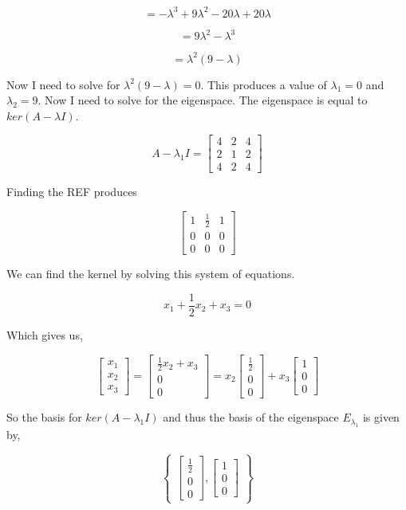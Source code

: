 \documentclass{article}
\begin{document}
\[ = -\lambda^3 + 9\lambda^2 - 20\lambda + 20\lambda \]

\[ = 9\lambda^2 - \lambda^3 \]

\[ = \lambda^2(9 - \lambda) \]

Now I need to solve for $\lambda^2(9 - \lambda) = 0$. This produces a value of $\lambda_1 = 0$ and $\lambda_2 = 9$. Now I need to solve for the eigenspace. The eigenspace is equal to $ker(A-\lambda I)$.

\[ A - \lambda_1 I = \begin{bmatrix} 4 & 2 & 4 \\ 2 & 1 & 2 \\ 4 & 2 & 4 \end{bmatrix} \]

Finding the REF produces

\[ \begin{bmatrix} 1 & \frac{1}{2} & 1 \\ 0 & 0 & 0 \\ 0 & 0 & 0 \end{bmatrix} \]

We can find the kernel by solving this system of equations.

\[ x_1 + \frac{1}{2} x_2 + x_3 = 0 \]

Which gives us,

\[ \begin{bmatrix} x_1 \\ x_2 \\ x_3 \end{bmatrix} = \begin{bmatrix} \frac{1}{2}x_2 + x_3 \\ 0 \\ 0 \end{bmatrix} = x_2\begin{bmatrix} \frac{1}{2} \\ 0 \\ 0 \end{bmatrix} + x_3\begin{bmatrix} 1 \\ 0 \\ 0 \end{bmatrix}\]

So the basis for $ker(A-\lambda_1 I)$ and thus the basis of the eigenspace $E_{\lambda_1}$ is given by,

\[ \begin{Bmatrix} \begin{bmatrix} \frac{1}{2} \\ 0 \\ 0\end{bmatrix}, \begin{bmatrix} 1 \\ 0 \\ 0 \end{bmatrix} \end{Bmatrix} \]
\end{document}
